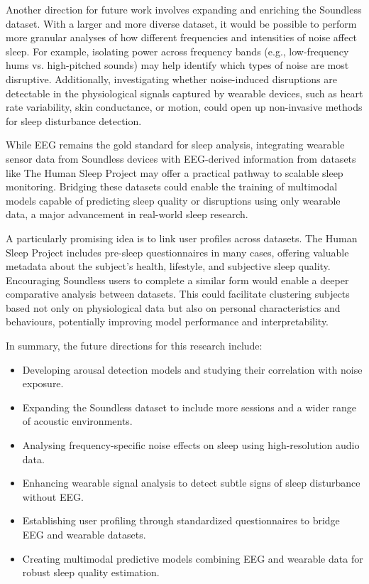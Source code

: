 Another direction for future work involves expanding and enriching the Soundless dataset. With a larger and more diverse dataset, it would be possible to perform more granular analyses of how different frequencies and intensities of noise affect sleep. For example, isolating power across frequency bands (e.g., low-frequency hums vs. high-pitched sounds) may help identify which types of noise are most disruptive. Additionally, investigating whether noise-induced disruptions are detectable in the physiological signals captured by wearable devices, such as heart rate variability, skin conductance, or motion, could open up non-invasive methods for sleep disturbance detection.

While EEG remains the gold standard for sleep analysis, integrating wearable sensor data from Soundless devices with EEG-derived information from datasets like The Human Sleep Project may offer a practical pathway to scalable sleep monitoring. Bridging these datasets could enable the training of multimodal models capable of predicting sleep quality or disruptions using only wearable data, a major advancement in real-world sleep research.

A particularly promising idea is to link user profiles across datasets. The Human Sleep Project includes pre-sleep questionnaires in many cases, offering valuable metadata about the subject's health, lifestyle, and subjective sleep quality. Encouraging Soundless users to complete a similar form would enable a deeper comparative analysis between datasets. This could facilitate clustering subjects based not only on physiological data but also on personal characteristics and behaviours, potentially improving model performance and interpretability.

In summary, the future directions for this research include:

\begin{itemize}
	\item Developing arousal detection models and studying their correlation with noise exposure.
	\item Expanding the Soundless dataset to include more sessions and a wider range of acoustic environments.
	\item Analysing frequency-specific noise effects on sleep using high-resolution audio data.
	\item Enhancing wearable signal analysis to detect subtle signs of sleep disturbance without EEG.
	\item Establishing user profiling through standardized questionnaires to bridge EEG and wearable datasets.
	\item Creating multimodal predictive models combining EEG and wearable data for robust sleep quality estimation.
\end{itemize}


